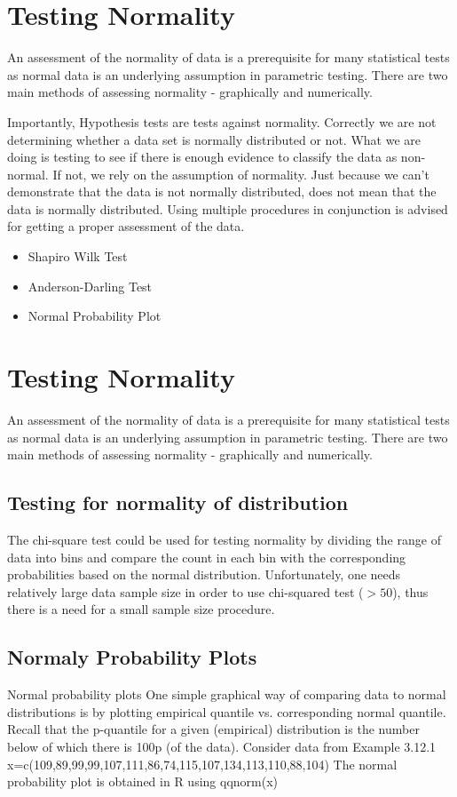\documentclass[12pt, a4paper]{article}
\begin{document}
\section{Testing Normality}

An assessment of the normality of data is a prerequisite for many statistical tests as normal data is an underlying assumption in parametric testing. There are two main methods of assessing normality - graphically and numerically.




Importantly, Hypothesis tests are tests against normality. Correctly we are not determining whether a data set is normally distributed or not.
What we are doing is testing to see if there is enough evidence to classify the data as non-normal. If not, we rely on the assumption of normality.
Just because we can't demonstrate that the data is not normally distributed, does not mean that the data is normally distributed.
Using multiple procedures in conjunction is advised for getting a proper assessment of the data.

\begin{itemize}
	\item Shapiro Wilk Test
	\item Anderson-Darling Test 
	\item Normal Probability Plot
\end{itemize}

\newpage

\section{Testing Normality}
An assessment of the normality of data is a prerequisite for many statistical tests as normal data is an underlying assumption in parametric testing. There are two main methods of assessing normality - graphically and numerically.


\subsection{Testing for normality of distribution}
The chi-square test could be used for testing normality by
dividing the range of data into bins and compare the count in
each bin with the corresponding probabilities based on the
normal distribution.
Unfortunately, one needs relatively large data sample size in
order to use chi-squared test ($> 50$), thus there is a need for a
small sample size procedure.

\subsection{Normaly Probability Plots}
Normal probability plots
One simple graphical way of comparing data to normal
distributions is by plotting empirical quantile vs.
corresponding normal quantile.
Recall that the p-quantile for a given (empirical) distribution
is the number below of which there is 100p%
(of the data).
Consider data from Example 3.12.1
x=c(109,89,99,99,107,111,86,74,115,107,134,113,110,88,104)
The normal probability plot is obtained in R using
qqnorm(x)
\end{document}
